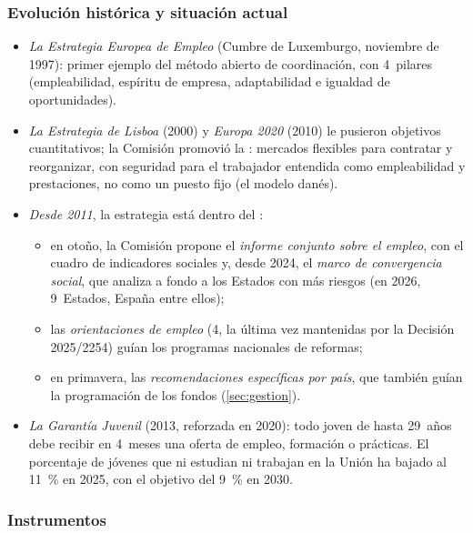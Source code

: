 \documentclass[11pt]{article}
\begin{document}
\subsubsection{Evolución histórica y situación actual}

\begin{itemize}
\item \emph{La Estrategia Europea de Empleo} (Cumbre de Luxemburgo, noviembre de 1997): primer ejemplo del método abierto de coordinación, con 4~pilares (empleabilidad, espíritu de empresa, adaptabilidad e igualdad de oportunidades).
\item \emph{La Estrategia de Lisboa} (2000) y \emph{Europa 2020} (2010) le pusieron objetivos cuantitativos; la Comisión promovió la : mercados flexibles para contratar y reorganizar, con seguridad para el trabajador entendida como empleabilidad y prestaciones, no como un puesto fijo (el modelo danés).
\item \emph{Desde 2011}, la estrategia está dentro del  :
  \begin{itemize}
  \item en otoño, la Comisión propone el \emph{informe conjunto sobre el empleo}, con el cuadro de indicadores sociales y, desde 2024, el \emph{marco de convergencia social}, que analiza a fondo a los Estados con más riesgos (en 2026, 9~Estados, España entre ellos);
  \item las \emph{orientaciones de empleo} (4, la última vez mantenidas por la Decisión 2025/2254) guían los programas nacionales de reformas;
  \item en primavera, las \emph{recomendaciones específicas por país}, que también guían la programación de los fondos (\ref{sec:gestion}).
  \end{itemize}
\item \emph{La Garantía Juvenil} (2013, reforzada en 2020): todo joven de hasta 29~años debe recibir en 4~meses una oferta de empleo, formación o prácticas. El porcentaje de jóvenes que ni estudian ni trabajan en la Unión ha bajado al 11~\% en 2025, con el objetivo del 9~\% en 2030\nocite{Consejo2026EMCO}.
\end{itemize}

\subsubsection{Instrumentos}
\end{document}
